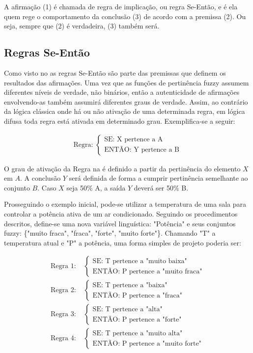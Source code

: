 A afirmação (1) é chamada de regra de implicação, ou regra Se-Então, e é ela quem rege o comportamento da conclusão (3) de acordo com a premissa (2). Ou seja, sempre que (2) é verdadeira, (3) também será.

\subsection{Regras Se-Então}
Como visto no  as regras Se-Então são parte das premissas que definem os resultados das afirmações. Uma vez que as funções de pertinência fuzzy assumem diferentes níveis de verdade, não binários, então a autenticidade de afirmações envolvendo-as também assumirá diferentes graus de verdade. Assim, ao contrário da lógica clássica onde há ou não ativação de uma determinada regra, em lógica difusa toda regra está ativada em determinado grau. Exemplifica-se a seguir:

\begin{align} \label{eqRegraDef}
\text{Regra: }
\begin{cases}
	\text{SE: X pertence a A} \\
	\text{ENTÃO: Y pertence a B}
\end{cases}		
\end{align}

O grau de ativação da Regra na  é definido a partir da pertinência do elemento $X$ em $A$. A conclusão $Y$ será definida de forma a cumprir pertinência semelhante ao conjunto $B$. Caso $X$ seja 50\% A, a saída $Y$ deverá ser 50\% B.

Prosseguindo o exemplo inicial, pode-se utilizar a temperatura de uma sala para controlar a potência ativa de um ar condicionado.  Seguindo os procedimentos descritos, define-se uma nova variável linguística: "Potência" e seus conjuntos fuzzy: \{"muito fraca", "fraca", "forte", "muito forte"\}. Chamando "T" a temperatura atual e "P" a potência, uma forma simples de projeto poderia ser:

\begin{align*} \label{eqRegrasExTemp}
\text{Regra 1: }
	&\begin{cases}
		\text{SE: T pertence a "muito baixa" } \\
		\text{ENTÃO: P pertence a "muito fraca"}
	\end{cases}		\\
\text{Regra 2: }
	&\begin{cases}
		\text{SE: T pertence a "baixa"} \\
		\text{ENTÃO: P pertence a "fraca"}
	\end{cases}		\\
\text{Regra 3: }
	&\begin{cases}
		\text{SE: T pertence a "alta"} \\
		\text{ENTÃO: P pertence a "forte"}
	\end{cases}		\\
\text{Regra 4: }
	&\begin{cases}
		\text{SE: T pertence a "muito alta"} \\
		\text{ENTÃO: P pertence a "muito forte"}
	\end{cases}		
\end{align*}

